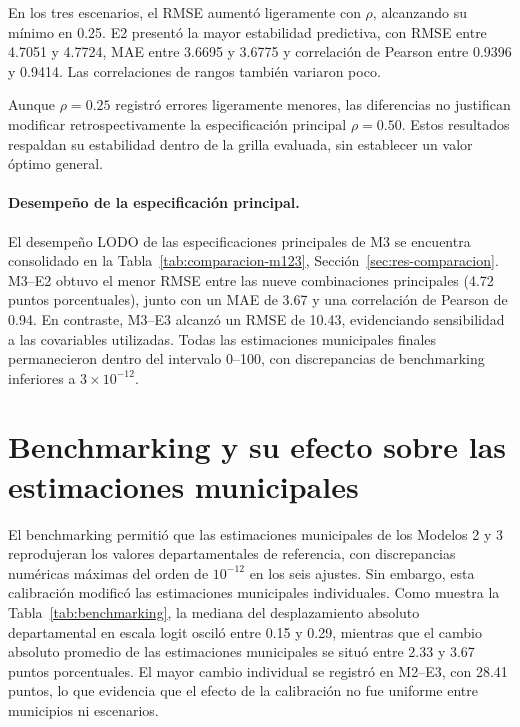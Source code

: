 En los tres escenarios, el RMSE aumentó ligeramente
con $\rho$, alcanzando su mínimo en 0.25. E2 presentó
la mayor estabilidad predictiva, con RMSE entre
4.7051 y 4.7724, MAE entre 3.6695 y 3.6775 y
correlación de Pearson entre 0.9396 y 0.9414.
Las correlaciones de rangos también variaron poco.

Aunque $\rho=0.25$ registró errores ligeramente
menores, las diferencias no justifican modificar
retrospectivamente la especificación principal
$\rho=0.50$. Estos resultados respaldan su
estabilidad dentro de la grilla evaluada, sin
establecer un valor óptimo general.

\paragraph{Desempeño de la especificación principal.}

El desempeño LODO de las especificaciones principales de M3 se encuentra consolidado en la Tabla~\ref{tab:comparacion-m123}, Sección~\ref{sec:res-comparacion}. M3--E2 obtuvo el menor RMSE entre las nueve combinaciones principales (4.72 puntos porcentuales), junto con un MAE de 3.67 y una correlación de Pearson de 0.94. En contraste, M3--E3 alcanzó un RMSE de 10.43, evidenciando sensibilidad a las covariables utilizadas. Todas las estimaciones municipales finales permanecieron dentro del intervalo 0--100, con discrepancias de benchmarking inferiores a $3\times10^{-12}$.

\section{Benchmarking y su efecto sobre las estimaciones municipales}
\label{sec:res-benchmarking}

El benchmarking permitió que las estimaciones municipales de los Modelos 2 y 3 reprodujeran los valores departamentales de referencia, con discrepancias numéricas máximas del orden de $10^{-12}$ en los seis ajustes. Sin embargo, esta calibración modificó las estimaciones municipales individuales. Como muestra la Tabla~\ref{tab:benchmarking}, la mediana del desplazamiento absoluto departamental en escala logit osciló entre 0.15 y 0.29, mientras que el cambio absoluto promedio de las estimaciones municipales se situó entre 2.33 y 3.67 puntos porcentuales. El mayor cambio individual se registró en M2--E3, con 28.41 puntos, lo que evidencia que el efecto de la calibración no fue uniforme entre municipios ni escenarios.

